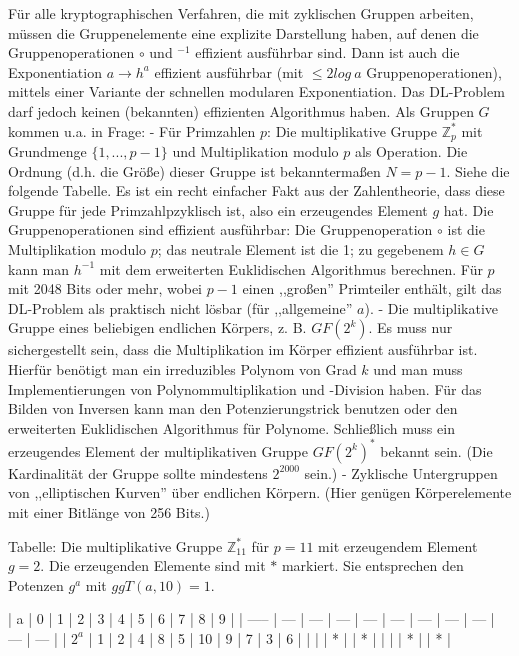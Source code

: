 \documentclass[a4paper]{article}
\begin{document}
\begin{multicols}{3}
{{{{Für alle kryptographischen Verfahren, die mit zyklischen Gruppen arbeiten, müssen die Gruppenelemente eine explizite Darstellung haben, auf denen die Gruppenoperationen $\circ$ und $^{-1}$ effizient ausführbar sind.
Dann ist auch die Exponentiation $a\rightarrow h^a$ effizient ausführbar (mit $\leq 2 log\ a$ Gruppenoperationen), mittels einer Variante der schnellen modularen Exponentiation. Das DL-Problem darf jedoch keinen (bekannten) effizienten Algorithmus haben.
Als Gruppen $G$ kommen u.a. in Frage:
- Für Primzahlen $p$: Die multiplikative Gruppe $\mathbb{Z}^*_p$ mit Grundmenge $\{1,...,p-1\}$ und Multiplikation modulo $p$ als Operation. Die Ordnung (d.h. die Größe) dieser Gruppe ist bekanntermaßen $N=p-1$. Siehe die folgende Tabelle. Es ist ein recht einfacher Fakt aus der Zahlentheorie, dass diese Gruppe für jede Primzahlpzyklisch ist, also ein erzeugendes Element $g$ hat. Die Gruppenoperationen sind effizient ausführbar: Die Gruppenoperation $\circ$ ist die Multiplikation modulo $p$; das neutrale Element ist die 1; zu gegebenem $h\in G$ kann man $h^{-1}$ mit dem erweiterten Euklidischen Algorithmus berechnen. Für $p$ mit 2048 Bits oder mehr, wobei $p-1$ einen ,,großen'' Primteiler enthält, gilt das DL-Problem als praktisch nicht lösbar (für ,,allgemeine'' $a$).
- Die multiplikative Gruppe eines beliebigen endlichen Körpers, z. B. $GF(2^k)$. Es muss nur sichergestellt sein, dass die Multiplikation im Körper effizient ausführbar ist. Hierfür benötigt man ein irreduzibles Polynom von Grad $k$ und man muss Implementierungen von Polynommultiplikation und -Division haben. Für das Bilden von Inversen kann man den Potenzierungstrick benutzen oder den erweiterten Euklidischen Algorithmus für Polynome. Schließlich muss ein erzeugendes Element der multiplikativen Gruppe $GF(2^k)^*$ bekannt sein. (Die Kardinalität der Gruppe sollte mindestens $2^{2000}$ sein.)
- Zyklische Untergruppen von ,,elliptischen Kurven'' über endlichen Körpern. (Hier genügen Körperelemente mit einer Bitlänge von 256 Bits.)

Tabelle: Die multiplikative Gruppe $\mathbb{Z}^*_{11}$ für $p=11$ mit erzeugendem Element $g=2$. Die erzeugenden Elemente sind mit $*$ markiert. Sie entsprechen den Potenzen $g^a$ mit $ggT(a,10) = 1$.

| a     | 0   | 1   | 2   | 3   | 4   | 5   | 6   | 7   | 8   | 9   |
| ----- | --- | --- | --- | --- | --- | --- | --- | --- | --- | --- |
| $2^a$ | 1   | 2   | 4   | 8   | 5   | 10  | 9   | 7   | 3   | 6   |
|       |     | *   |     | *   |     |     |     | *   |     | *   |

}}}}
\end{multicols}
\end{document}
